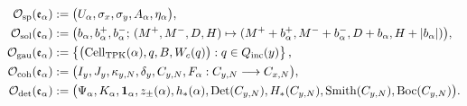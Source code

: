 \begin{align}
 \mathcal O_{\rm sp}(\mathfrak e_\alpha)
 &:=
 \bigl(U_\alpha,\sigma_x,\sigma_y,
 A_\alpha,\eta_\alpha\bigr),
 \label{rm:eq:pdfv2-cor-accion-sp}\\
 \mathcal O_{\rm sol}(\mathfrak e_\alpha)
 &:=
 \bigl(b_\alpha,b_\alpha^+,b_\alpha^-;\,
 (M^+,M^-,D,H)\mapsto
 (M^++b_\alpha^+,M^-+b_\alpha^-,
  D+b_\alpha,H+|b_\alpha|)\bigr),
 \label{rm:eq:pdfv2-cor-accion-sol}\\
 \mathcal O_{\rm gau}(\mathfrak e_\alpha)
 &:=
 \left\{
 \bigl(\operatorname{Cell}_{\rm TPK}(\alpha),
 q,B,W_c(q)\bigr):
 q\in Q_{\rm inc}(y)
 \right\},
 \label{rm:eq:pdfv2-cor-accion-gau}\\
 \mathcal O_{\rm coh}(\mathfrak e_\alpha)
 &:=
 \bigl(I_y,J_y,\kappa_{y,N},\delta_y,C_{y,N},
 F_\alpha:C_{y,N}\longrightarrow C_{x,N}\bigr),
 \label{rm:eq:pdfv2-cor-accion-coh}\\
 \mathcal O_{\rm det}(\mathfrak e_\alpha)
 &:=
 \bigl(\Psi_\alpha,K_\alpha,\mathbf1_\alpha,z_\pm(\alpha),
 h_*(\alpha),\operatorname{Det}(C_{y,N}),H_*(C_{y,N}),
 \operatorname{Smith}(C_{y,N}),\operatorname{Boc}(C_{y,N})\bigr).
 \label{rm:eq:pdfv2-cor-accion-det}
\end{align}

